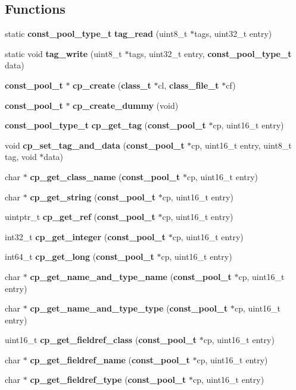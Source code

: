 \subsection*{Functions}
\begin{DoxyCompactItemize}
\item 
static {\bf const\_\-pool\_\-type\_\-t} {\bf tag\_\-read} (uint8\_\-t $\ast$tags, uint32\_\-t entry)
\item 
static void {\bf tag\_\-write} (uint8\_\-t $\ast$tags, uint32\_\-t entry, {\bf const\_\-pool\_\-type\_\-t} data)
\item 
{\bf const\_\-pool\_\-t} $\ast$ {\bf cp\_\-create} ({\bf class\_\-t} $\ast$cl, {\bf class\_\-file\_\-t} $\ast$cf)
\item 
{\bf const\_\-pool\_\-t} $\ast$ {\bf cp\_\-create\_\-dummy} (void)
\item 
{\bf const\_\-pool\_\-type\_\-t} {\bf cp\_\-get\_\-tag} ({\bf const\_\-pool\_\-t} $\ast$cp, uint16\_\-t entry)
\item 
void {\bf cp\_\-set\_\-tag\_\-and\_\-data} ({\bf const\_\-pool\_\-t} $\ast$cp, uint16\_\-t entry, uint8\_\-t tag, void $\ast$data)
\item 
char $\ast$ {\bf cp\_\-get\_\-class\_\-name} ({\bf const\_\-pool\_\-t} $\ast$cp, uint16\_\-t entry)
\item 
char $\ast$ {\bf cp\_\-get\_\-string} ({\bf const\_\-pool\_\-t} $\ast$cp, uint16\_\-t entry)
\item 
uintptr\_\-t {\bf cp\_\-get\_\-ref} ({\bf const\_\-pool\_\-t} $\ast$cp, uint16\_\-t entry)
\item 
int32\_\-t {\bf cp\_\-get\_\-integer} ({\bf const\_\-pool\_\-t} $\ast$cp, uint16\_\-t entry)
\item 
int64\_\-t {\bf cp\_\-get\_\-long} ({\bf const\_\-pool\_\-t} $\ast$cp, uint16\_\-t entry)
\item 
char $\ast$ {\bf cp\_\-get\_\-name\_\-and\_\-type\_\-name} ({\bf const\_\-pool\_\-t} $\ast$cp, uint16\_\-t entry)
\item 
char $\ast$ {\bf cp\_\-get\_\-name\_\-and\_\-type\_\-type} ({\bf const\_\-pool\_\-t} $\ast$cp, uint16\_\-t entry)
\item 
uint16\_\-t {\bf cp\_\-get\_\-fieldref\_\-class} ({\bf const\_\-pool\_\-t} $\ast$cp, uint16\_\-t entry)
\item 
char $\ast$ {\bf cp\_\-get\_\-fieldref\_\-name} ({\bf const\_\-pool\_\-t} $\ast$cp, uint16\_\-t entry)
\item 
char $\ast$ {\bf cp\_\-get\_\-fieldref\_\-type} ({\bf const\_\-pool\_\-t} $\ast$cp, uint16\_\-t entry)

\end{DoxyCompactItemize}
